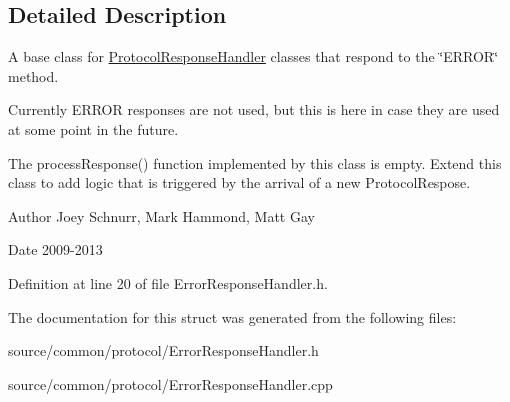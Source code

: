 \subsection{Detailed Description}
A base class for \hyperlink{struct_picto_1_1_protocol_response_handler}{Protocol\-Response\-Handler} classes that respond to the \char`\"{}\-E\-R\-R\-O\-R\char`\"{} method. 

Currently E\-R\-R\-O\-R responses are not used, but this is here in case they are used at some point in the future.

The process\-Response() function implemented by this class is empty. Extend this class to add logic that is triggered by the arrival of a new Protocol\-Respose. \begin{DoxyAuthor}{Author}
Joey Schnurr, Mark Hammond, Matt Gay 
\end{DoxyAuthor}
\begin{DoxyDate}{Date}
2009-\/2013 
\end{DoxyDate}


Definition at line 20 of file Error\-Response\-Handler.\-h.



The documentation for this struct was generated from the following files\-:\begin{DoxyCompactItemize}
\item 
source/common/protocol/Error\-Response\-Handler.\-h\item 
source/common/protocol/Error\-Response\-Handler.\-cpp\end{DoxyCompactItemize}
